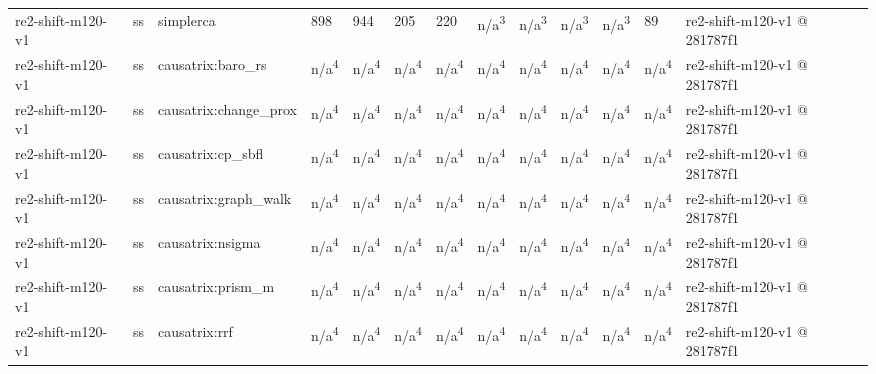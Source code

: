 \begin{table}[t]
\begin{tabular}{lllllllllllll}
re2-shift-m120-v1 & ss & simplerca & 898 & 944 & 205 & 220 & n/a\textsuperscript{3} & n/a\textsuperscript{3} & n/a\textsuperscript{3} & n/a\textsuperscript{3} & 89 & re2-shift-m120-v1 @ 281787f1 \\
re2-shift-m120-v1 & ss & causatrix:baro\_rs & n/a\textsuperscript{4} & n/a\textsuperscript{4} & n/a\textsuperscript{4} & n/a\textsuperscript{4} & n/a\textsuperscript{4} & n/a\textsuperscript{4} & n/a\textsuperscript{4} & n/a\textsuperscript{4} & n/a\textsuperscript{4} & re2-shift-m120-v1 @ 281787f1 \\
re2-shift-m120-v1 & ss & causatrix:change\_prox & n/a\textsuperscript{4} & n/a\textsuperscript{4} & n/a\textsuperscript{4} & n/a\textsuperscript{4} & n/a\textsuperscript{4} & n/a\textsuperscript{4} & n/a\textsuperscript{4} & n/a\textsuperscript{4} & n/a\textsuperscript{4} & re2-shift-m120-v1 @ 281787f1 \\
re2-shift-m120-v1 & ss & causatrix:cp\_sbfl & n/a\textsuperscript{4} & n/a\textsuperscript{4} & n/a\textsuperscript{4} & n/a\textsuperscript{4} & n/a\textsuperscript{4} & n/a\textsuperscript{4} & n/a\textsuperscript{4} & n/a\textsuperscript{4} & n/a\textsuperscript{4} & re2-shift-m120-v1 @ 281787f1 \\
re2-shift-m120-v1 & ss & causatrix:graph\_walk & n/a\textsuperscript{4} & n/a\textsuperscript{4} & n/a\textsuperscript{4} & n/a\textsuperscript{4} & n/a\textsuperscript{4} & n/a\textsuperscript{4} & n/a\textsuperscript{4} & n/a\textsuperscript{4} & n/a\textsuperscript{4} & re2-shift-m120-v1 @ 281787f1 \\
re2-shift-m120-v1 & ss & causatrix:nsigma & n/a\textsuperscript{4} & n/a\textsuperscript{4} & n/a\textsuperscript{4} & n/a\textsuperscript{4} & n/a\textsuperscript{4} & n/a\textsuperscript{4} & n/a\textsuperscript{4} & n/a\textsuperscript{4} & n/a\textsuperscript{4} & re2-shift-m120-v1 @ 281787f1 \\
re2-shift-m120-v1 & ss & causatrix:prism\_m & n/a\textsuperscript{4} & n/a\textsuperscript{4} & n/a\textsuperscript{4} & n/a\textsuperscript{4} & n/a\textsuperscript{4} & n/a\textsuperscript{4} & n/a\textsuperscript{4} & n/a\textsuperscript{4} & n/a\textsuperscript{4} & re2-shift-m120-v1 @ 281787f1 \\
re2-shift-m120-v1 & ss & causatrix:rrf & n/a\textsuperscript{4} & n/a\textsuperscript{4} & n/a\textsuperscript{4} & n/a\textsuperscript{4} & n/a\textsuperscript{4} & n/a\textsuperscript{4} & n/a\textsuperscript{4} & n/a\textsuperscript{4} & n/a\textsuperscript{4} & re2-shift-m120-v1 @ 281787f1 \\

\end{tabular}
\end{table}
